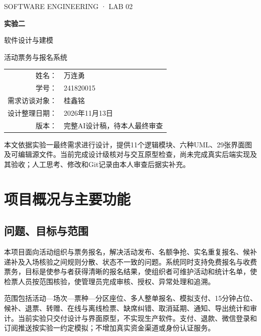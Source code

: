 \documentclass[UTF8,zihao=-4,fontset=windows]{ctexart}
\begin{document}
\begin{titlepage}
\centering\vspace*{25mm}
{\small SOFTWARE ENGINEERING · LAB 02\par}
\vspace{12mm}
{\Huge\bfseries 实验二\par}\vspace{5mm}
{\LARGE 软件设计与建模\par}\vspace{13mm}
{\Large\color{brand} 活动票务与报名系统\par}
\vspace{22mm}
\begin{tabular}{rl}
姓名：&万连勇\\[3mm]
学号：&241820015\\[3mm]
需求访谈对象：&桂鑫铭\\[3mm]
设计整理日期：&2026年11月13日\\[3mm]
版本：&完整AI设计稿，待本人最终审查
\end{tabular}
\vfill
\begin{minipage}{0.86\linewidth}\small
本文依据实验一最终需求进行设计，提供11个逻辑模块、六种UML、29张界面图及可编辑源文件。当前完成设计级核对与交互原型检查，尚未完成真实后端实现及其验收；人工思考、修改和Git记录由本人审查后据实补充。
\end{minipage}
\end{titlepage}
\setcounter{tocdepth}{1}
\tableofcontents\clearpage{}

\section{项目概况与主要功能}

\subsection{问题、目标与范围}
本项目面向活动组织与票务报名，解决活动发布、名额争抢、实名重复报名、候补递补及入场核验之间规则分散、状态不一致的问题。系统同时支持免费报名与收费票务，目标是使参与者获得清晰的报名结果，使组织者可维护活动和统计名单，使检票人员按范围核验，使管理员完成审核、授权、异常处理和追溯。

范围包括活动—场次—票种—分区座位、多人整单报名、模拟支付、15分钟占位、候补、退票、转赠、在线与离线检票、缺席纠错、取消延期、通知、导出统计和审计。当前实验只交付设计与界面原型，不实现生产软件。支付、退款、微信登录和订阅推送按实验一约定模拟；不增加真实资金渠道或身份认证服务。
\end{document}

